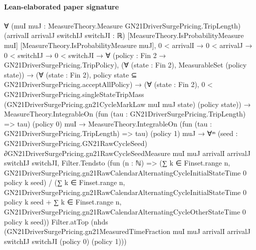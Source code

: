 \documentclass[10pt]{article}
\begin{document}
\paragraph{Lean-elaborated paper signature}
\begin{ReviewVerbatim}
∀ (muI muJ : MeasureTheory.Measure GN21DriverSurgePricing.TripLength) (arrivalI arrivalJ switchIJ switchJI : ℝ)
  [MeasureTheory.IsProbabilityMeasure muI] [MeasureTheory.IsProbabilityMeasure muJ],
  0 < arrivalI →
    0 < arrivalJ →
      0 < switchIJ →
        0 < switchJI →
          ∀ (policy : Fin 2 → GN21DriverSurgePricing.TripPolicy),
            (∀ (state : Fin 2), MeasurableSet (policy state)) →
              (∀ (state : Fin 2), policy state ⊆ GN21DriverSurgePricing.acceptAllPolicy) →
                (∀ (state : Fin 2),
                    0 <
                      GN21DriverSurgePricing.singleStateTripMass (GN21DriverSurgePricing.gn21CycleMarkLaw muI muJ state)
                        (policy state)) →
                  MeasureTheory.IntegrableOn (fun (tau : GN21DriverSurgePricing.TripLength) => tau) (policy 0) muI →
                    MeasureTheory.IntegrableOn (fun (tau : GN21DriverSurgePricing.TripLength) => tau) (policy 1) muJ →
                      ∀ᵐ (seed :
                        GN21DriverSurgePricing.GN21RawCycleSeed) ∂GN21DriverSurgePricing.gn21RawCycleSeedMeasure muI muJ
                          arrivalI arrivalJ switchIJ switchJI,
                        Filter.Tendsto
                          (fun (n : ℕ) =>
                            (∑ k ∈ Finset.range n,
                                GN21DriverSurgePricing.gn21RawCalendarAlternatingCycleInitialStateTime 0 policy k
                                  seed) /
                              (∑ k ∈ Finset.range n,
                                  GN21DriverSurgePricing.gn21RawCalendarAlternatingCycleInitialStateTime 0 policy k
                                    seed +
                                ∑ k ∈ Finset.range n,
                                  GN21DriverSurgePricing.gn21RawCalendarAlternatingCycleOtherStateTime 0 policy k seed))
                          Filter.atTop
                          (nhds
                            (GN21DriverSurgePricing.gn21MeasuredTimeFraction muI muJ arrivalI arrivalJ switchIJ switchJI
                              (policy 0) (policy 1)))
\end{ReviewVerbatim}
\end{document}
